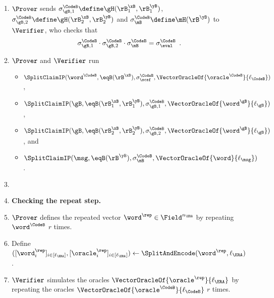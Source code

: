\begin{tcolorbox}[breakable, enhanced, colback=white, boxrule=0.65pt]
\begin{enumerate}[nolistsep]
\begin{align*}
        \end{align*}
        to checking the following claim at a random points $\rB^{\yB} = (\rB^{\yB}_1, \rB^{\yB}_2)$ sampled by $\Verifier$:
        \begin{align*}
            \gH(\rB^{\xB}_1, \rB^{\yB}_1) \cdot \gH(\rB^{\xB}_2, \rB^{\yB}_2) \cdot \mH(\rB^{\yB}) = \sigma^{\CodeB}_{\eval} \enspace.
        \end{align*}
        \item $\Prover$ sends $\sigma^{\CodeB}_{\gB,1} \define \gH(\rB^{\xB}_1, \rB^{\yB}_1)$, $\sigma^{\CodeB}_{\gB,2} \define \gH(\rB^{\xB}_2, \rB^{\yB}_2)$ and $\sigma^{\CodeB}_{\mB} \define \mH(\rB^{\yB})$ to $\Verifier$, who checks that
        \[
            \sigma^{\CodeB}_{\gB,1} \cdot \sigma^{\CodeB}_{\gB,2} \cdot \sigma^{\CodeB}_{\mB} = \sigma^{\CodeB}_{\eval} \enspace .
        \]
        \item $\Prover$ and $\Verifier$ run
        \begin{itemize}[nolistsep]
            \item $\SplitClaimIP(\word^{\CodeB}, \eqB(\rB^{\xB}), \sigma^{\CodeB}_{\scsf}, \VectorOracleOf{\oracle^{\CodeB}}{\ell_{\CodeB}})$,
            \item $\SplitClaimIP(\gB, \eqB(\rB^{\xB}_1, \rB^{\yB}_1), \sigma^{\CodeB}_{\gB,1}, \VectorOracleOf{\word^{\gB}}{\ell_{\gB}})$,
            \item $\SplitClaimIP(\gB, \eqB(\rB^{\xB}_2, \rB^{\yB}_2), \sigma^{\CodeB}_{\gB,2}, \VectorOracleOf{\word^{\gB}}{\ell_{\gB}})$, and
            \item $\SplitClaimIP(\msg, \eqB(\rB^{\yB}), \sigma^{\CodeB}_{\mB}, \VectorOracleOf{\word}{\ell_{\msg}})$.
        \end{itemize}
        
        \item[] \item[] \textbf{Checking the repeat step.}
        \item $\Prover$ defines the repeated vector $\word^{\rep} \in \Field^{n_{\ERA}}$ by repeating $\word^{\CodeB}$  $r$ times.
        \item Define $([\word^{\rep}_i]_{i \in [\ell_{\ERA}]}, [\oracle^{\rep}_i]_{i \in [\ell_{\ERA}]}) \gets \SplitAndEncode(\word^{\rep}, \ell_{\ERA})$.
        \item $\Verifier$ simulates the oracles $\VectorOracleOf{\oracle^{\rep}}{\ell_{\ERA}}$ by repeating the oracles $\VectorOracleOf{\oracle^{\CodeB}}{\ell_{\CodeB}}$ $r$ times.
        

\end{enumerate}
\end{tcolorbox}
